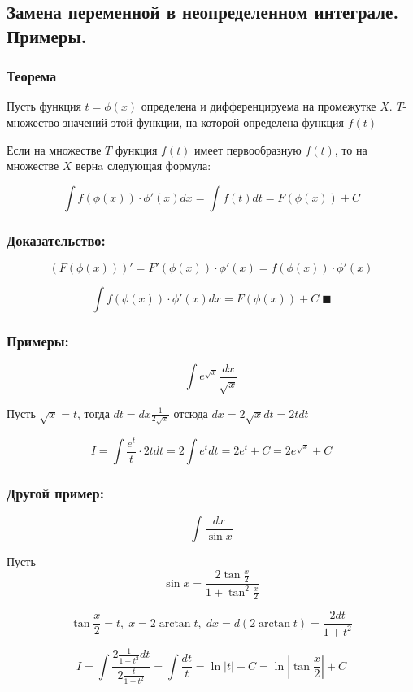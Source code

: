 \documentclass[a4paper,12pt]{article}
\theoremstyle{plain} %
\theoremstyle{definition} %
\theoremstyle{remark} %
\begin{document}
\newpage
\subsection*{Замена переменной в неопределенном интеграле. Примеры.}

\subsubsection*{Теорема}
Пусть функция $t = \phi(x)$ определена и дифференцируема на промежутке $X$. $T$- множество значений этой функции, на которой определена функция $f(t)$

Если на множестве $T$ функция $f(t)$ имеет первообразную $f(t)$, то на множестве $X$ вернa следующая формула:

\[
	\int f(\phi(x)) \cdot \phi'(x) dx = \int f(t) dt = F(\phi(x)) + C
\]

\subsubsection*{Доказательство:}
\[
	(F(\phi(x)))' = F'(\phi(x)) \cdot \phi'(x) = f(\phi(x)) \cdot \phi'(x)
\]

\[
	\int f(\phi(x)) \cdot \phi'(x) dx = F(\phi(x)) + C \; \blacksquare
\]

\subsubsection*{Примеры:}

\[
	\int e^{\sqrt{x}} \frac{dx}{\sqrt{x}}
\]

Пусть $\sqrt{x} = t$, тогда $dt = dx \frac{1}{2\sqrt{x}}$ отсюда $dx = 2\sqrt{x} dt = 2t dt$

\[
	I = \int \frac{e^t}{t} \cdot 2tdt = 2 \int e^t dt = 2e^t + C = 2 e^{\sqrt{x}} + C
\]

\subsubsection*{Другой пример:}

\[
	\int \frac{dx}{\sin x}
\]

Пусть
\[
	\sin x = \frac{2 \tan{ \frac{x}{2}}}{1 + \tan^2{\frac{x}{2}}}
\]

\[
	\tan \frac{x}{2} = t, \; x = 2\arctan t, \; dx = d(2 \arctan t) = \frac{2dt}{1 + t^2}
\]

\[
	I = \int \frac{ 2 \frac{1}{1 + t^2} dt }{ 2 \frac{t}{1 + t^2} } = \int \frac{dt}{t} = \ln |t| + C = \ln | \tan \frac{x}{2} | + C
\]
\end{document}
